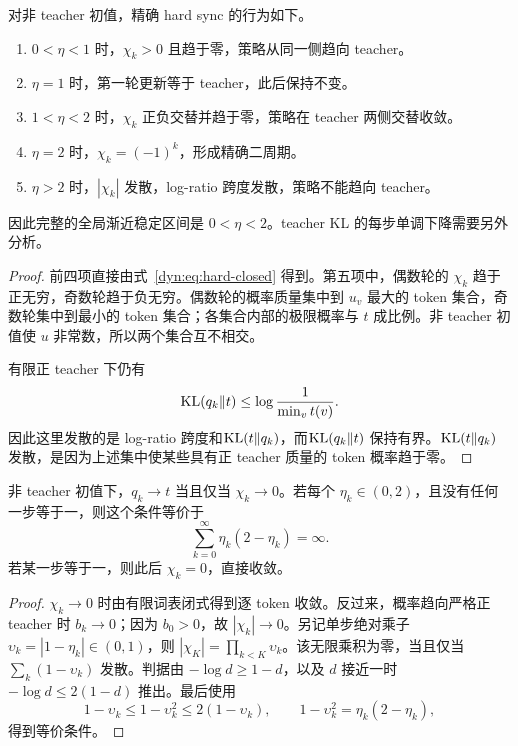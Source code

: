 \begin{corollary}[常步长的完整稳定分类]
对非 teacher 初值，精确 hard sync 的行为如下。
\begin{enumerate}
 \item $0<\eta<1$ 时，$\chi_k>0$ 且趋于零，策略从同一侧趋向 teacher。
 \item $\eta=1$ 时，第一轮更新等于 teacher，此后保持不变。
 \item $1<\eta<2$ 时，$\chi_k$ 正负交替并趋于零，策略在 teacher 两侧交替收敛。
 \item $\eta=2$ 时，$\chi_k=(-1)^k$，形成精确二周期。
 \item $\eta>2$ 时，$|\chi_k|$ 发散，log-ratio 跨度发散，策略不能趋向 teacher。
\end{enumerate}
因此完整的全局渐近稳定区间是 $0<\eta<2$。teacher KL 的每步单调下降需要另外分析。
\end{corollary}

\begin{proof}
前四项直接由式~\eqref{dyn:eq:hard-closed} 得到。第五项中，偶数轮的 $\chi_k$ 趋于正无穷，奇数轮趋于负无穷。偶数轮的概率质量集中到 $u_v$ 最大的 token 集合，奇数轮集中到最小的 token 集合；各集合内部的极限概率与 $t$ 成比例。非 teacher 初值使 $u$ 非常数，所以两个集合互不相交。

有限正 teacher 下仍有
\begin{equation*}
 \operatorname{KL}(q_k\Vert t)\leq\log\frac1{\min_vt(v)}.
\end{equation*}
因此这里发散的是 log-ratio 跨度和$\operatorname{KL}(t\Vert q_k)$，而$\operatorname{KL}(q_k\Vert t)$ 保持有界。$\operatorname{KL}(t\Vert q_k)$ 发散，是因为上述集中使某些具有正 teacher 质量的 token 概率趋于零。
\end{proof}

\begin{proposition}[变步长的充要条件]
非 teacher 初值下，$q_k\to t$ 当且仅当 $\chi_k\to0$。若每个 $\eta_k\in(0,2)$，且没有任何一步等于一，则这个条件等价于
\begin{equation*}
 \sum_{k=0}^{\infty}\eta_k(2-\eta_k)=\infty.
\end{equation*}
若某一步等于一，则此后 $\chi_k=0$，直接收敛。
\end{proposition}

\begin{proof}
$\chi_k\to0$ 时由有限词表闭式得到逐 token 收敛。反过来，概率趋向严格正 teacher 时 $b_k\to0$；因为 $b_0>0$，故 $|\chi_k|\to0$。另记单步绝对乘子 $\upsilon_k=|1-\eta_k|\in(0,1)$，则 $|\chi_K|=\prod_{k<K}\upsilon_k$。该无限乘积为零，当且仅当 $\sum_k(1-\upsilon_k)$ 发散。判据由 $-\log d\geq1-d$，以及 $d$ 接近一时 $-\log d\leq2(1-d)$ 推出。最后使用
\begin{equation*}
 1-\upsilon_k\leq1-\upsilon_k^2\leq2(1-\upsilon_k),
 \qquad 1-\upsilon_k^2=\eta_k(2-\eta_k),
\end{equation*}
得到等价条件。
\end{proof}

